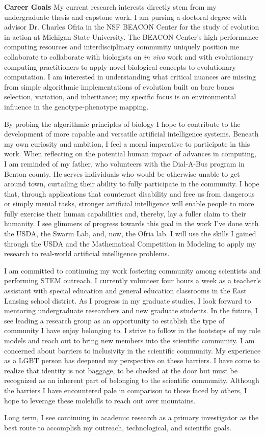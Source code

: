 \textbf{Career Goals}
My current research interests directly stem from my undergraduate thesis and capstone work.
I am pursing a doctoral degree with advisor Dr. Charles Ofria in the NSF BEACON Center for the study of evolution in action at Michigan State University.
The BEACON Center's high performance computing resources and interdisciplinary community uniquely position me collaborate to collaborate with biologists on \textit{in vivo} work and with evolutionary computing practitioners to apply novel biological concepts to evolutionary computation.
I am interested in understanding what critical nuances are missing from simple algorithmic implementations of evolution built on bare bones selection, variation, and inheritance;
my specific focus is on environmental influence in the genotype-phenotype mapping.

By probing the algorithmic principles of biology I hope to contribute to the development of more capable and versatile artificial intelligence systems.
Beneath my own curiosity and ambition, I feel a moral imperative to participate in this work.
When reflecting on the potential human impact of advances in computing, I am reminded of my father, who volunteers with the Dial-A-Bus program in Benton county.
He serves individuals who would be otherwise unable to get around town, curtailing their ability to fully participate in the community.
I hope that, through applications that counteract disability and free us from dangerous or simply menial tasks, stronger artificial intelligence will enable people to more fully exercise their human capabilities and, thereby, lay a fuller claim to their humanity.
I see glimmers of progress towards this goal in the work I've done with the USDA, the Swarm Lab, and, now, the Ofria lab.
I will use the skills I gained through the USDA and the Mathematical Competition in Modeling to apply my research to real-world artificial intelligence problems.

I am committed to continuing my work fostering community among scientists and performing STEM outreach.
I currently volunteer four hours a week as a teacher's assistant with special education and general education classrooms in the East Lansing school district.
As I progress in my graduate studies, I look forward to mentoring undergraduate researchers and new graduate students.
In the future, I see leading a research group as an opportunity to establish the type of community I have enjoy belonging to.
I strive to follow in the footsteps of my role models and reach out to bring new members into the scientific community.
I am concerned about barriers to inclusivity in the scientific community.
My experience as a LGBT person has deepened my perspective on these barriers.
I have come to realize that identity is not baggage, to be checked at the door but must be recognized as an inherent part of belonging to the scientific community.
Although the barriers I have encountered pale in comparison to those faced by others, I hope to leverage these molehills to reach out over mountains.

Long term, I see continuing in academic research as a primary investigator as the best route to accomplish my outreach, technological, and scientific goals.
